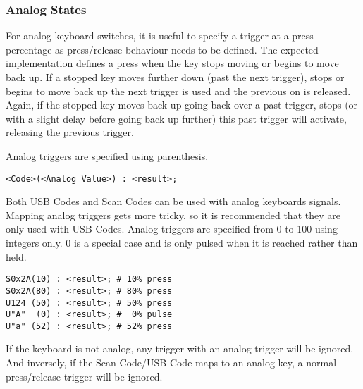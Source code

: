 \documentclass{kiibohd-template}
\begin{document}




\subsubsection{Analog States}

For analog keyboard switches, it is useful to specify a trigger at a press percentage as press/release behaviour needs to be defined.
The expected implementation defines a press when the key stops moving or begins to move back up.
If a stopped key moves further down (past the next trigger), stops or begins to move back up the next trigger is used and the previous on is released.
Again, if the stopped key moves back up going back over a past trigger, stops (or with a slight delay before going back up further) this past trigger will activate, releasing the previous trigger.

Analog triggers are specified using parenthesis.

\begin{lstlisting}
<Code>(<Analog Value>) : <result>;
\end{lstlisting}

Both USB Codes and Scan Codes can be used with analog keyboards signals.
Mapping analog triggers gets more tricky, so it is recommended that they are only used with USB Codes.
Analog triggers are specified from 0 to 100 using integers only.
0 is a special case and is only pulsed when it is reached rather than held.

\begin{lstlisting}
S0x2A(10) : <result>; # 10% press
S0x2A(80) : <result>; # 80% press
U124 (50) : <result>; # 50% press
U"A"  (0) : <result>; #  0% pulse
U"a" (52) : <result>; # 52% press
\end{lstlisting}

If the keyboard is not analog, any trigger with an analog trigger will be ignored.
And inversely, if the Scan Code/USB Code maps to an analog key, a normal press/release trigger will be ignored.
\end{document}
